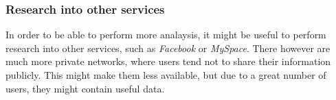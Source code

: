 \subsubsection{Research into other services}
In order to be able to perform more analaysis, it might be useful to perform research into other services, such as \textit{Facebook} or \textit{MySpace}. There however are much more private networks, where users tend not to share
their information publicly. This might make them less available, but due to a great number of users, they might contain
useful data.
